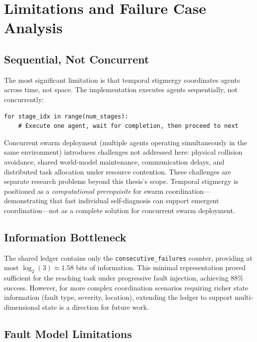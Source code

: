 \documentclass[12pt,a4paper,oneside]{report}
\begin{document}
\section{Limitations and Failure Case Analysis}

\subsection{Sequential, Not Concurrent}
\label{subsec:sequential_not_concurrent}

The most significant limitation is that temporal stigmergy coordinates agents across time, not space. The implementation executes agents sequentially, not concurrently:

\begin{verbatim}
for stage_idx in range(num_stages):
    # Execute one agent, wait for completion, then proceed to next
\end{verbatim}

Concurrent swarm deployment (multiple agents operating simultaneously in the same environment) introduces challenges not addressed here: physical collision avoidance, shared world-model maintenance, communication delays, and distributed task allocation under resource contention. These challenges are separate research problems beyond this thesis's scope. Temporal stigmergy is positioned as a \textit{computational prerequisite} for swarm coordination—demonstrating that fast individual self-diagnosis can support emergent coordination—not as a complete solution for concurrent swarm deployment.

\subsection{Information Bottleneck}
\label{subsec:information_bottleneck}

The shared ledger contains only the \texttt{consecutive\_failures} counter, providing at most $\log_2(3) \approx 1.58$ bits of information. This minimal representation proved sufficient for the reaching task under progressive fault injection, achieving 88\% success. However, for more complex coordination scenarios requiring richer state information (fault type, severity, location), extending the ledger to support multi-dimensional state is a direction for future work.

\subsection{Fault Model Limitations}
\label{subsec:fault_model_limitations}
\end{document}
